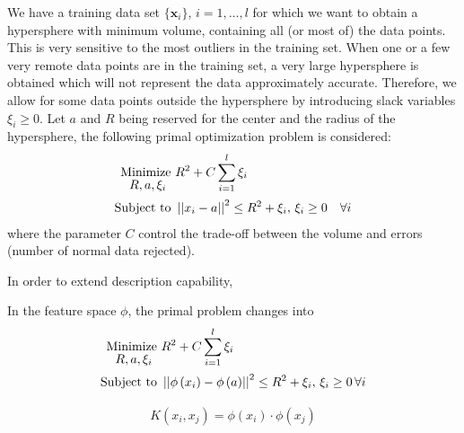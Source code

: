\documentclass[journal,transmag,times]{IEEEtran}
\begin{document}
We have a training data set $\{ \mathbf{x}_i \}$, $i=1,\dots,l$ for which we want to obtain a hypersphere with minimum volume, containing all (or most of) the data points. This is very sensitive to the most outliers in the training set. When one or a few very remote data points are in the training set, a very large hypersphere is obtained which will not represent the data approximately accurate. Therefore, we allow for some data points outside the hypersphere by introducing slack variables $\xi_i \ge 0$. Let $a$ and $R$ being reserved for the center and the radius of the hypersphere, the following primal optimization problem is considered:
\begin{subequations}\label{eq:svdd_primal_sphere}
\begin{align}
\underset{
	\begin{array}{c}
		 R, a, \xi_i
	\end{array}}{\text{Minimize }} & R^2 + C \sum_{i=1}^l \xi_i \\
\text{Subject to } & \left|\left| x_i - a \right|\right|^2 \le R^2 + \xi_i, \thinspace \xi_i \ge 0 \quad \forall i
\end{align}
\end{subequations}
where the parameter $C$ control the trade-off between the volume and errors (number of normal data rejected).

In order to extend description capability,

In the feature space $\phi$, the primal problem changes into
\begin{subequations}\label{eq:svdd_primal}
\begin{align}
\underset{
	\begin{array}{c}
		 R, a, \xi_i
	\end{array}}{\text{Minimize }} & R^2 + C \sum_{i=1}^l \xi_i \\
\text{Subject to } & \left|\left| \phi \left(x_i\right) - \phi \left( a \right) \right|\right|^2 \le R^2 + \xi_i, \thinspace \xi_i \ge 0 \thinspace \forall i
\end{align}
\end{subequations}

\begin{align}
K \left( x_i, x_j \right) = \phi \left( x_i \right) \cdot \phi \left( x_j \right)
\end{align}
\end{document}
